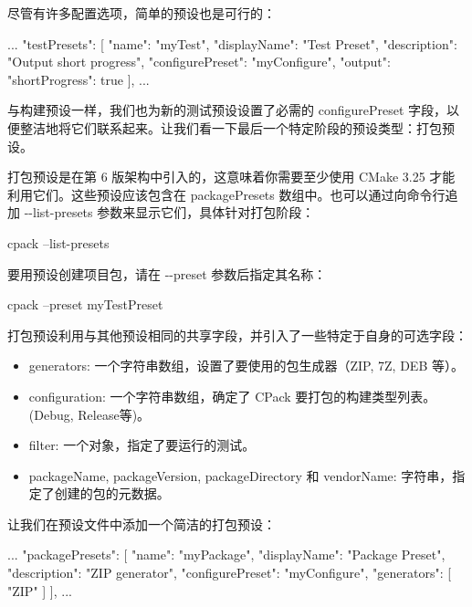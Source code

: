 尽管有许多配置选项，简单的预设也是可行的：


\begin{json}
...
"testPresets": [
    {
        "name": "myTest",
        "displayName": "Test Preset",
        "description": "Output short progress",
        "configurePreset": "myConfigure",
        "output": {
            "shortProgress": true
        }
    }
],
...
\end{json}

与构建预设一样，我们也为新的测试预设设置了必需的 configurePreset 字段，以便整洁地将它们联系起来。让我们看一下最后一个特定阶段的预设类型：打包预设。


打包预设是在第 6 版架构中引入的，这意味着你需要至少使用 CMake 3.25 才能利用它们。这些预设应该包含在 packagePresets 数组中。也可以通过向命令行追加 -{}-list-presets 参数来显示它们，具体针对打包阶段：

\begin{shell}
cpack --list-presets
\end{shell}

要用预设创建项目包，请在 -{}-preset 参数后指定其名称：

\begin{shell}
cpack --preset myTestPreset
\end{shell}

打包预设利用与其他预设相同的共享字段，并引入了一些特定于自身的可选字段：

\begin{itemize}
\item
generators: 一个字符串数组，设置了要使用的包生成器（ZIP, 7Z, DEB 等）。

\item
configuration: 一个字符串数组，确定了 CPack 要打包的构建类型列表。 (Debug, Release等)。

\item
filter:  一个对象，指定了要运行的测试。

\item
packageName, packageVersion, packageDirectory 和 vendorName: 字符串，指定了创建的包的元数据。
\end{itemize}

让我们在预设文件中添加一个简洁的打包预设：


\begin{json}
...
    "packagePresets": [
        {
            "name": "myPackage",
            "displayName": "Package Preset",
            "description": "ZIP generator",
            "configurePreset": "myConfigure",
            "generators": [
            "ZIP"
            ]
        }
    ],
...
\end{json}

